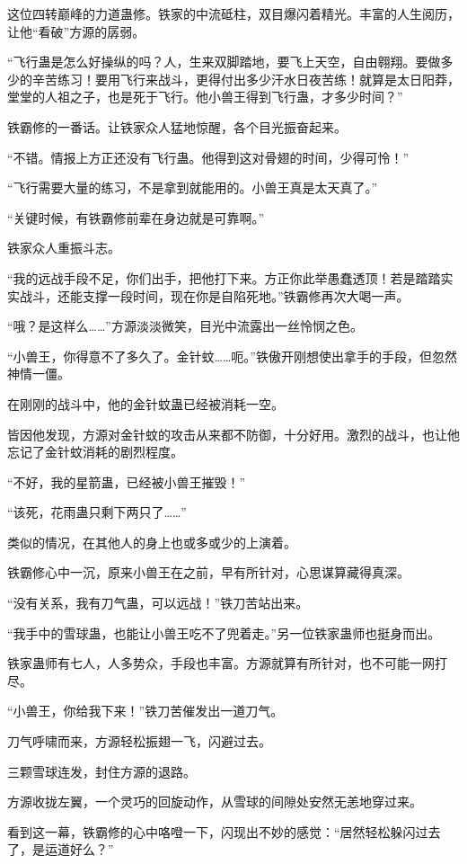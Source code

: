 \begin{this_body}
这位四转巅峰的力道蛊修。铁家的中流砥柱，双目爆闪着精光。丰富的人生阅历，让他“看破”方源的孱弱。

“飞行蛊是怎么好操纵的吗？人，生来双脚踏地，要飞上天空，自由翱翔。要做多少的辛苦练习！要用飞行来战斗，更得付出多少汗水日夜苦练！就算是太日阳莽，堂堂的人祖之子，也是死于飞行。他小兽王得到飞行蛊，才多少时间？”

铁霸修的一番话。让铁家众人猛地惊醒，各个目光振奋起来。

“不错。情报上方正还没有飞行蛊。他得到这对骨翅的时间，少得可怜！”

“飞行需要大量的练习，不是拿到就能用的。小兽王真是太天真了。”

“关键时候，有铁霸修前辈在身边就是可靠啊。”

铁家众人重振斗志。

“我的远战手段不足，你们出手，把他打下来。方正你此举愚蠢透顶！若是踏踏实实战斗，还能支撑一段时间，现在你是自陷死地。”铁霸修再次大喝一声。

“哦？是这样么……”方源淡淡微笑，目光中流露出一丝怜悯之色。

“小兽王，你得意不了多久了。金针蚊……呃。”铁傲开刚想使出拿手的手段，但忽然神情一僵。

在刚刚的战斗中，他的金针蚊蛊已经被消耗一空。

皆因他发现，方源对金针蚊的攻击从来都不防御，十分好用。激烈的战斗，也让他忘记了金针蚊消耗的剧烈程度。

“不好，我的星箭蛊，已经被小兽王摧毁！”

“该死，花雨蛊只剩下两只了……”

类似的情况，在其他人的身上也或多或少的上演着。

铁霸修心中一沉，原来小兽王在之前，早有所针对，心思谋算藏得真深。

“没有关系，我有刀气蛊，可以远战！”铁刀苦站出来。

“我手中的雪球蛊，也能让小兽王吃不了兜着走。”另一位铁家蛊师也挺身而出。

铁家蛊师有七人，人多势众，手段也丰富。方源就算有所针对，也不可能一网打尽。

“小兽王，你给我下来！”铁刀苦催发出一道刀气。

刀气呼啸而来，方源轻松振翅一飞，闪避过去。

三颗雪球连发，封住方源的退路。

方源收拢左翼，一个灵巧的回旋动作，从雪球的间隙处安然无恙地穿过来。

看到这一幕，铁霸修的心中咯噔一下，闪现出不妙的感觉：“居然轻松躲闪过去了，是运道好么？”


\end{this_body}
